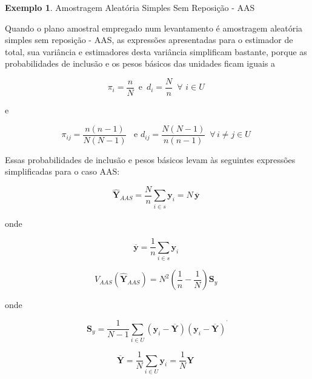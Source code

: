 \documentclass[
  12pt,
  brazilian,
]{book}
\theoremstyle{definition}
\theoremstyle{definition}
\newtheorem{example}{Exemplo}[chapter]
\theoremstyle{definition}
\theoremstyle{definition}
\theoremstyle{remark}
\begin{document}
\begin{example}
\protect\hypertarget{exm:exe31}{}{\label{exm:exe31} }Amostragem Aleatória Simples Sem Reposição - AAS
\end{example}

Quando o plano amostral empregado num levantamento é amostragem aleatória simples sem reposição - AAS, as expressões apresentadas para o estimador de total, sua variância e estimadores desta variância simplificam bastante, porque as probabilidades de inclusão e os pesos básicos das unidades ficam iguais a

\begin{equation}
\pi_i = \frac{n}{N}\,\text{ e }\, d_i = \frac{N}{n} \, \,\, \forall \,\,i \in U  \,\, \label{eq:estpa5}
\end{equation}

e

\begin{equation}
\pi_{ij} = \frac{n(n-1)}{N(N-1)} \,\, \,\,\,\text{e} \,\,  d_{ij} = \frac{N(N-1)}{n(n-1)} \,\,\, \forall \, i \neq j \in U \,\, \label{eq:estpa6} 
\end{equation}

Essas probabilidades de inclusão e pesos básicos levam às seguintes expressões simplificadas para o caso AAS:

\begin{equation}
\widehat{\mathbf{Y}}_{AAS} = \frac{N}{n} \sum_{i \in s} \mathbf{y}_i = N \, \overline{\mathbf{y}}  \,\, \label{eq:estpa7}
\end{equation}

onde

\begin{equation}
\overline{\mathbf{y}} = \frac{1}{n} \sum_{i \in s} \mathbf{y}_i  \,\, \label{eq:estpa8}
\end{equation}

\begin{equation}
V_{AAS} \left( \mathbf{\widehat{Y}}_{AAS} \right) = N^{2} \left( \frac{1}{n} - \frac{1}{N} \right) \mathbf{S}_y \,\, \label{eq:estpa9}
\end{equation}

onde

\begin{equation}
\mathbf{S}_y = \frac{1}{N-1} \sum_{i \in U} \left( \mathbf{y}_i - \overline{ \mathbf{Y}} \right) \left( \mathbf{y}_i - \overline{\mathbf{Y}} \right) ^{^{\prime }}   \label{eq:estpa10}
\end{equation}

\begin{equation}
\overline{\mathbf{Y}} = \frac{1}{N} \sum_{i \in U} \mathbf{y}_i = \frac{1}{N} \mathbf{Y} \,\,\, \label{eq:estpa11}
\end{equation}
\end{document}
